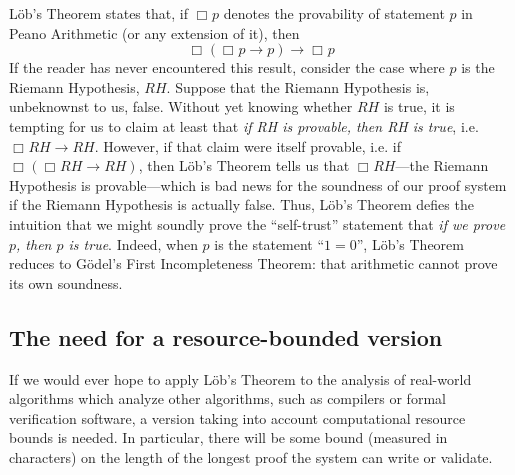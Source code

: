 \documentclass[onecolumn]{miri-tech-article}
\newtheorem*{theorem*}{Theorem}
\numberwithin{equation}{section}
\theoremstyle{definition}
\newcommand{\NN}{\mathbb{N}}
\newcommand{\proves}[1]{\underset{#1}{\vdash}}
\newcommand{\bx}[1]{\Box_{#1}}
\renewcommand{\implies}{\rightarrow}
\renewcommand{\-}{^{-1}}
\begin{document}
%
%
%
% 

L\"{o}b's Theorem states that, if $\bx{}p$ denotes the provability of statement $p$ in Peano Arithmetic (or any extension of it), then 
$$\bx{}(\bx{}p \implies p) \implies \bx{}p$$
If the reader has never encountered this result, consider the case where $p$ is the Riemann Hypothesis, $RH$.  Suppose that the Riemann Hypothesis is, unbeknownst to us, false.  Without yet knowing whether $RH$ is true, it is tempting for us to claim at least that {\em if RH is provable, then RH is true}, i.e. $\bx{}RH \implies RH$.  However, if that claim were itself provable, i.e. if $\bx{}(\bx{}RH \implies RH)$, then L\"{o}b's Theorem tells us that $\bx{}RH$---the Riemann Hypothesis is provable---which is bad news for the soundness of our proof system if the Riemann Hypothesis is actually false.  Thus, L\"{o}b's Theorem defies the intuition that we might soundly prove the ``self-trust'' statement that {\em if we prove $p$, then $p$ is true}.  Indeed, when $p$ is the statement ``$1=0$'', L\"{o}b's Theorem reduces to G\"{o}del's First Incompleteness Theorem: that arithmetic cannot prove its own soundness.

\subsection{The need for a resource-bounded version} 
If we would ever hope to apply L\"{o}b's Theorem to the analysis of real-world algorithms which analyze other algorithms, such as compilers or formal verification software, a version taking into account computational resource bounds is needed.  In particular, there will be some bound (measured in characters) on the length of the longest proof the system can write or validate.
\end{document}
